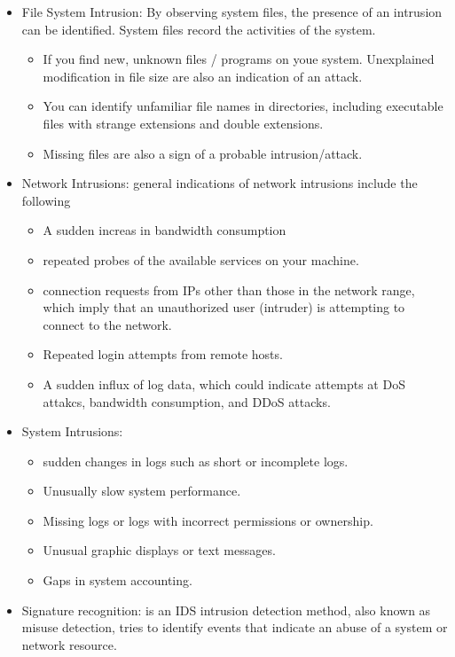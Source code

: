 \begin{itemize}
    \item File System Intrusion: By observing system files, the presence of an intrusion can be identified. System files record the activities of the system.
    \begin{itemize}
        \item If you find new, unknown files / programs on youe system. Unexplained modification in file size are also an indication of an attack.
        \item You can identify unfamiliar file names in directories, including executable files with strange extensions and double extensions.
        \item Missing files are also a sign of a probable intrusion/attack.
    \end{itemize}
    \item Network Intrusions: general indications of network intrusions include the following
    \begin{itemize}
        \item A sudden increas in bandwidth consumption
        \item repeated probes of the available services on your machine.
        \item connection requests from IPs other than those in the network range, which imply that an unauthorized user (intruder) is attempting to connect to the network.
        \item Repeated login attempts from remote hosts.
        \item A sudden influx of log data, which could indicate attempts at DoS attakcs, bandwidth consumption, and DDoS attacks.
    \end{itemize}
    \item System Intrusions:
    \begin{itemize}
        \item sudden changes in logs such as short or incomplete logs.
        \item Unusually slow system performance.
        \item Missing logs or logs with incorrect permissions or ownership.
        \item Unusual graphic displays or text messages.
        \item Gaps in system accounting.
    \end{itemize}
    \item Signature recognition: is an IDS intrusion detection method, also known as misuse detection, tries to identify events that indicate an abuse of a system or network resource.

\end{itemize}
